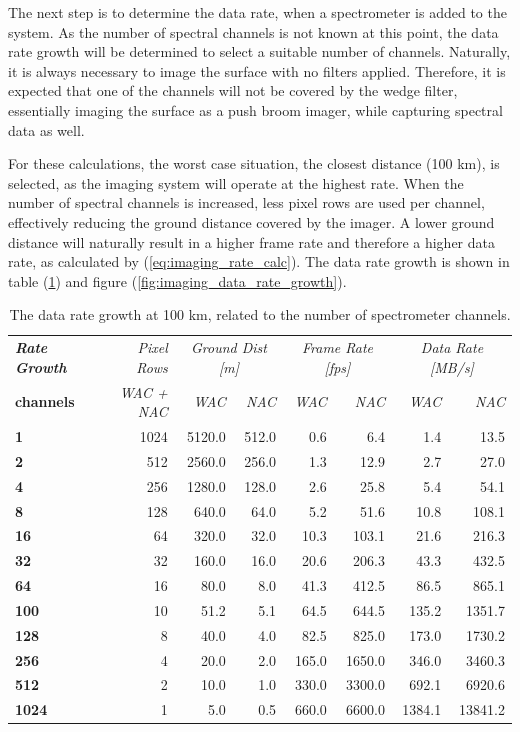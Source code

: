 The next step is to determine the data rate, when a spectrometer is added to the system. As the number of spectral channels is not known at this point, the data rate growth will be determined to select a suitable number of channels. Naturally, it is always necessary to image the surface with no filters applied. Therefore, it is expected that one of the channels will not be covered by the wedge filter, essentially imaging the surface as a push broom imager, while capturing spectral data as well.

For these calculations, the worst case situation, the closest distance (100 km), is selected, as the imaging system will operate at the highest rate. When the number of spectral channels is increased, less pixel rows are used per channel, effectively reducing the ground distance covered by the imager. A lower ground distance will naturally result in a higher frame rate and therefore a higher data rate, as calculated by (\ref{eq:imaging_rate_calc}). The data rate growth is shown in table (\ref{tab:imaging_data_rate_growth}) and figure (\ref{fig:imaging_data_rate_growth}).
\begin{table}[htb]
  \centering
    \begin{tabular}{l|r|r|r|r|r|r|r|}
\textit{\textbf{Rate Growth}} & \textit{Pixel Rows} & \multicolumn{2}{c|}{\textit{Ground Dist [m]}} & \multicolumn{2}{c|}{\textit{Frame Rate [fps]}} & \multicolumn{2}{c}{\textit{Data Rate [MB/s]}} \bigstrut[b]\\
\cline{1-1}\textbf{channels} & \textit{WAC + NAC} & \textit{WAC} & \textit{NAC} & \textit{WAC} & \textit{NAC} & \textit{WAC} & \multicolumn{1}{r}{\textit{NAC}} \bigstrut\\
\hline
\textbf{1} & 1024  & 5120.0 & 512.0 & 0.6   & 6.4   & 1.4   & 13.5 \bigstrut[t]\\
\textbf{2} & 512   & 2560.0 & 256.0 & 1.3   & 12.9  & 2.7   & 27.0 \\
\textbf{4} & 256   & 1280.0 & 128.0 & 2.6   & 25.8  & 5.4   & 54.1 \\
\textbf{8} & 128   & 640.0 & 64.0  & 5.2   & 51.6  & 10.8  & 108.1 \\
\textbf{16} & 64    & 320.0 & 32.0  & 10.3  & 103.1 & 21.6  & 216.3 \\
\textbf{32} & 32    & 160.0 & 16.0  & 20.6  & 206.3 & 43.3  & 432.5 \\
\textbf{64} & 16    & 80.0  & 8.0   & 41.3  & 412.5 & 86.5  & 865.1 \\
\textbf{100} & 10    & 51.2  & 5.1   & 64.5  & 644.5 & 135.2 & 1351.7 \\
\textbf{128} & 8     & 40.0  & 4.0   & 82.5  & 825.0 & 173.0 & 1730.2 \\
\textbf{256} & 4     & 20.0  & 2.0   & 165.0 & 1650.0 & 346.0 & 3460.3 \\
\textbf{512} & 2     & 10.0  & 1.0   & 330.0 & 3300.0 & 692.1 & 6920.6 \\
\textbf{1024} & 1     & 5.0   & 0.5   & 660.0 & 6600.0 & 1384.1 & 13841.2 \\
\end{tabular}%
    \caption{The data rate growth at 100 km, related to the number of spectrometer channels.}
  \label{tab:imaging_data_rate_growth}%
\end{table}%

